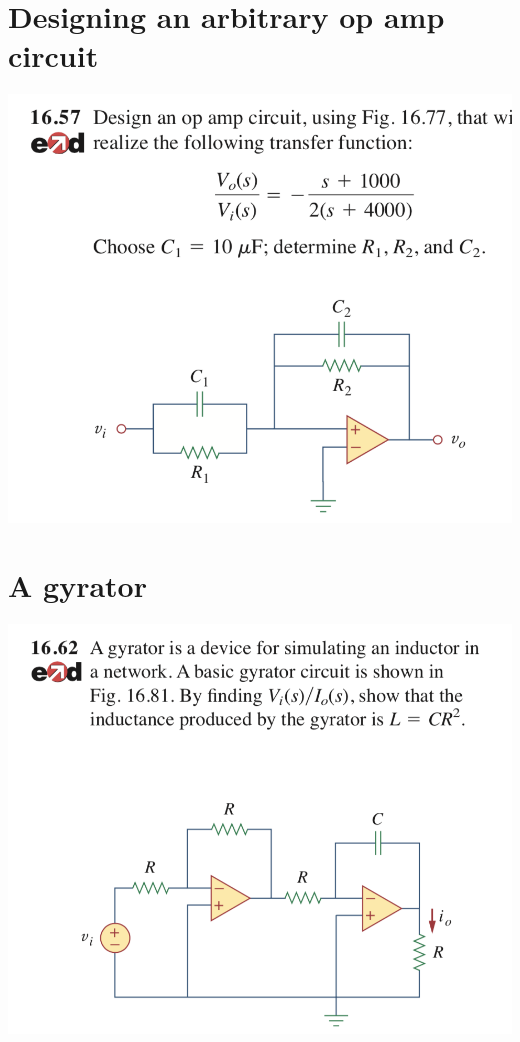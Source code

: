 \documentclass[11pt]{book}
\begin{document}
\newpage

\section{Designing an arbitrary op amp circuit}
\begin{center}
	\includegraphics[width=\textwidth]{figures/q3.38.png} 
\end{center}

\newpage

\section{A gyrator}
\begin{center}
	\includegraphics[width=\textwidth]{figures/q3.39.png} 
\end{center}
\end{document}
